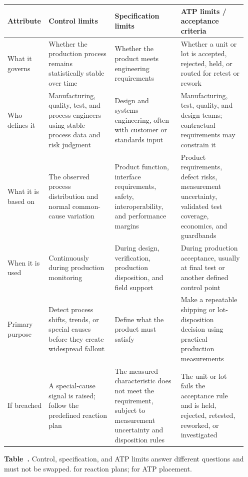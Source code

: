 \begin{table}[ht]
\label{tab:mfg-three-limits}%
\centering
\setlength{\tabcolsep}{3pt}%
\footnotesize
\renewcommand{\arraystretch}{1.15}%
\begin{tabular}{@{}p{0.14\linewidth}p{0.27\linewidth}p{0.27\linewidth}p{0.27\linewidth}@{}}
\toprule
Attribute & Control limits & Specification limits &
ATP limits / acceptance criteria \\
\midrule
What it governs &
Whether the production process remains statistically stable over time &
Whether the product meets engineering requirements &
Whether a unit or lot is accepted, rejected, held, or routed for retest or
rework \\
\addlinespace[0.45em]
Who defines it &
Manufacturing, quality, test, and process engineers using stable process data
and risk judgment &
Design and systems engineering, often with customer or standards input &
Manufacturing, test, quality, and design teams; contractual requirements may
constrain it \\
\addlinespace[0.45em]
What it is based on &
The observed process distribution and normal common-cause variation &
Product function, interface requirements, safety, interoperability, and
performance margins &
Product requirements, defect risks, measurement uncertainty, validated test
coverage, economics, and guardbands \\
\addlinespace[0.45em]
When it is used &
Continuously during production monitoring &
During design, verification, production disposition, and field support &
During production acceptance, usually at final test or another defined control
point \\
\addlinespace[0.45em]
Primary purpose &
Detect process shifts, trends, or special causes before they create widespread
fallout &
Define what the product must satisfy &
Make a repeatable shipping or lot-disposition decision using practical
production measurements \\
\addlinespace[0.45em]
If breached &
A special-cause signal is raised; follow the predefined reaction plan &
The measured characteristic does not meet the requirement, subject to
measurement uncertainty and disposition rules &
The unit or lot fails the acceptance rule and is held, rejected, retested,
reworked, or investigated \\
\bottomrule
\end{tabular}
\par\medskip
{\raggedright\footnotesize\textbf{Table~\thetable.} Control, specification, and
ATP limits answer different questions and must not be swapped.
 for reaction plans;  for ATP
placement.\par}
\end{table}
\FloatBarrier

